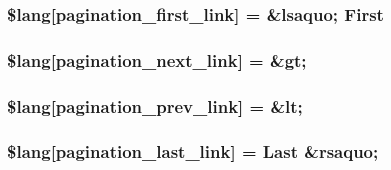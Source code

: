 \subsubsection[{\$lang}]{\setlength{\rightskip}{0pt plus 5cm}\$lang\mbox{[}\textquotesingle{}pagination\+\_\+first\+\_\+link\textquotesingle{}\mbox{]} = \textquotesingle{}\&lsaquo; First\textquotesingle{}}\label{pagination__lang_8php_a9786c3ca317374647c440f713c686d49}
\hypertarget{pagination__lang_8php_a485f808a96ff78250ab760d638f3ddc7}{}
\subsubsection[{\$lang}]{\setlength{\rightskip}{0pt plus 5cm}\$lang\mbox{[}\textquotesingle{}pagination\+\_\+next\+\_\+link\textquotesingle{}\mbox{]} = \textquotesingle{}\&gt;\textquotesingle{}}\label{pagination__lang_8php_a485f808a96ff78250ab760d638f3ddc7}
\hypertarget{pagination__lang_8php_a5388708db9e549b8ec5ec4cd49073c84}{}
\subsubsection[{\$lang}]{\setlength{\rightskip}{0pt plus 5cm}\$lang\mbox{[}\textquotesingle{}pagination\+\_\+prev\+\_\+link\textquotesingle{}\mbox{]} = \textquotesingle{}\&lt;\textquotesingle{}}\label{pagination__lang_8php_a5388708db9e549b8ec5ec4cd49073c84}
\hypertarget{pagination__lang_8php_aa4f66cf3f9c7c4b479f01776761faea6}{}
\subsubsection[{\$lang}]{\setlength{\rightskip}{0pt plus 5cm}\$lang\mbox{[}\textquotesingle{}pagination\+\_\+last\+\_\+link\textquotesingle{}\mbox{]} = \textquotesingle{}Last \&rsaquo;\textquotesingle{}}\label{pagination__lang_8php_aa4f66cf3f9c7c4b479f01776761faea6}
